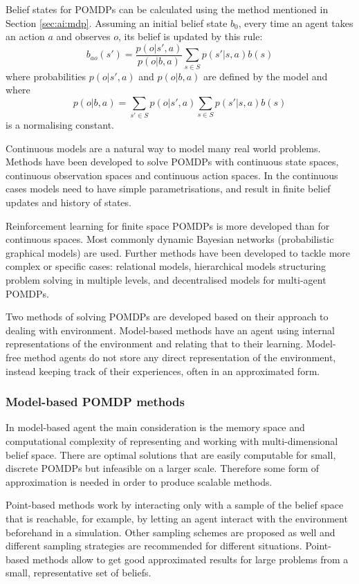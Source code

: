Belief states for POMDPs can be calculated using the method mentioned in
Section \ref{sec:ai:mdp}. Assuming an initial belief state \(b_0\), every time
an agent takes an action \(a\) and observes \(o\), its belief is updated by
this rule: \[ b_{ao}(s') = \frac{ p(o|s',a) }{ p(o|b,a) } \sum_{s \in S}
p(s'|s,a) b(s) \] where probabilities \(p(o|s',a)\) and \(p(o|b,a)\) are
defined by the model and where \[p(o|b,a) = \sum_{s' \in S} p(o|s',a) \sum_{s
\in S} p(s'|s,a) b(s) \] is a normalising constant.
\parencite{Spaan2012ai+pomdp}

Continuous models are a natural way to model many real world problems. Methods
have been developed to solve POMDPs with continuous state spaces, continuous
observation spaces and continuous action spaces. In the continuous cases models
need to have simple parametrisations, and result in finite belief updates and
history of states. \parencite{Spaan2012ai+pomdp}

Reinforcement learning for finite space POMDPs is more developed than for
continuous spaces. Most commonly dynamic Bayesian networks (probabilistic
graphical models) are used. Further methods have been developed to tackle more
complex or specific cases: relational models, hierarchical models structuring
problem solving in multiple levels, and decentralised models for multi-agent
POMDPs. \parencite{Spaan2012ai+pomdp}

Two methods of solving POMDPs are developed based on their approach to dealing
with environment. Model-based methods have an agent using internal
representations of the environment and relating that to their learning. Model-
free method agents do not store any direct representation of the environment,
instead keeping track of their experiences, often in an approximated form.


\subsubsection{Model-based POMDP methods}
\label{sec:ai:pomdp:model:based}

In model-based agent the main consideration is the memory space and
computational complexity of representing and working with multi-dimensional
belief space. There are optimal solutions that are easily computable for small,
discrete POMDPs but infeasible on a larger scale. Therefore some form of
approximation is needed in order to produce scalable methods.
\parencite{Spaan2012ai+pomdp}

Point-based methods work by interacting only with a sample of the belief space
that is reachable, for example, by letting an agent interact with the
environment beforehand in a simulation. Other sampling schemes are proposed as
well and different sampling strategies are recommended for different
situations. Point-based methods allow to get good approximated results for
large problems from a small, representative set of beliefs.
\parencite{Spaan2012ai+pomdp}

